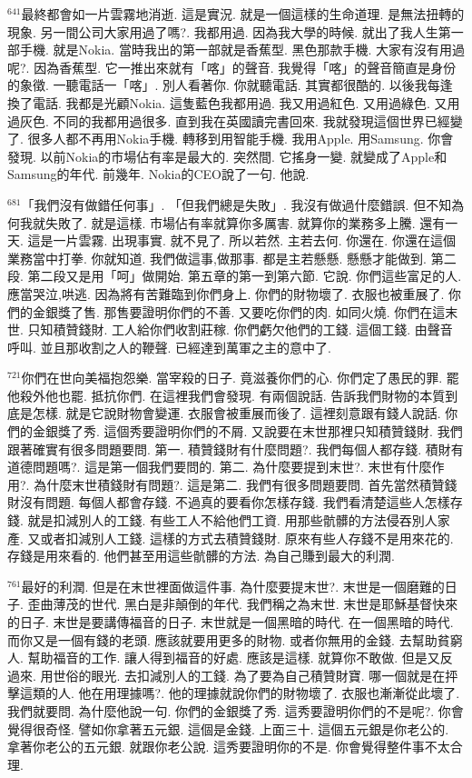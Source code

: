 \documentclass{book}
\begin{document}
$^{641}$最終都會如一片雲霧地消逝.
這是實況.
就是一個這樣的生命道理.
是無法扭轉的現象.
另一間公司大家用過了嗎?.
我都用過.
因為我大學的時候.
就出了我人生第一部手機.
就是Nokia.
當時我出的第一部就是香蕉型.
黑色那款手機.
大家有沒有用過呢?.
因為香蕉型.
它一推出來就有「喀」的聲音.
我覺得「喀」的聲音簡直是身份的象徵.
一聽電話一「喀」.
別人看著你.
你就聽電話.
其實都很酷的.
以後我每逢換了電話.
我都是光顧Nokia.
這隻藍色我都用過.
我又用過紅色.
又用過綠色.
又用過灰色.
不同的我都用過很多.
直到我在英國讀完書回來.
我就發現這個世界已經變了.
很多人都不再用Nokia手機.
轉移到用智能手機.
我用Apple.
用Samsung.
你會發現.
以前Nokia的市場佔有率是最大的.
突然間.
它搖身一變.
就變成了Apple和Samsung的年代.
前幾年.
Nokia的CEO說了一句.
他說.

$^{681}$「我們沒有做錯任何事」.
「但我們總是失敗」.
我沒有做過什麼錯誤.
但不知為何我就失敗了.
就是這樣.
市場佔有率就算你多厲害.
就算你的業務多上騰.
還有一天.
這是一片雲霧.
出現事實.
就不見了.
所以若然.
主若去何.
你還在.
你還在這個業務當中打拳.
你就知道.
我們做這事,做那事.
都是主若懸懸.
懸懸才能做到.
第二段.
第二段又是用「呵」做開始.
第五章的第一到第六節.
它說.
你們這些富足的人.
應當哭泣,哄逃.
因為將有苦難臨到你們身上.
你們的財物壞了.
衣服也被重展了.
你們的金銀獎了售.
那售要證明你們的不善.
又要吃你們的肉.
如同火燒.
你們在這末世.
只知積贊錢財.
工人給你們收割莊稼.
你們虧欠他們的工錢.
這個工錢.
由聲音呼叫.
並且那收割之人的鞭聲.
已經達到萬軍之主的意中了.

$^{721}$你們在世向美福抱怨樂.
當宰殺的日子.
竟滋養你們的心.
你們定了愚民的罪.
罷他殺外他也罷.
抵抗你們.
在這裡我們會發現.
有兩個說話.
告訴我們財物的本質到底是怎樣.
就是它說財物會變運.
衣服會被重展而後了.
這裡刻意跟有錢人說話.
你們的金銀獎了秀.
這個秀要證明你們的不屑.
又說要在末世那裡只知積贊錢財.
我們跟著確實有很多問題要問.
第一.
積贊錢財有什麼問題?.
我們每個人都存錢.
積財有道德問題嗎?.
這是第一個我們要問的.
第二.
為什麼要提到末世?.
末世有什麼作用?.
為什麼末世積錢財有問題?.
這是第二.
我們有很多問題要問.
首先當然積贊錢財沒有問題.
每個人都會存錢.
不過真的要看你怎樣存錢.
我們看清楚這些人怎樣存錢.
就是扣減別人的工錢.
有些工人不給他們工資.
用那些骯髒的方法侵吞別人家產.
又或者扣減別人工錢.
這樣的方式去積贊錢財.
原來有些人存錢不是用來花的.
存錢是用來看的.
他們甚至用這些骯髒的方法.
為自己賺到最大的利潤.

$^{761}$最好的利潤.
但是在末世裡面做這件事.
為什麼要提末世?.
末世是一個磨難的日子.
歪曲薄茂的世代.
黑白是非顛倒的年代.
我們稱之為末世.
末世是耶穌基督快來的日子.
末世是要講傳福音的日子.
末世就是一個黑暗的時代.
在一個黑暗的時代.
而你又是一個有錢的老頭.
應該就要用更多的財物.
或者你無用的金錢.
去幫助貧窮人.
幫助福音的工作.
讓人得到福音的好處.
應該是這樣.
就算你不敢做.
但是又反過來.
用世俗的眼光.
去扣減別人的工錢.
為了要為自己積贊財寶.
哪一個就是在抨擊這類的人.
他在用理據嗎?.
他的理據就說你們的財物壞了.
衣服也漸漸從此壞了.
我們就要問.
為什麼他說一句.
你們的金銀獎了秀.
這秀要證明你們的不是呢?.
你會覺得很奇怪.
譬如你拿著五元銀.
這個是金錢.
上面三十.
這個五元銀是你老公的.
拿著你老公的五元銀.
就跟你老公說.
這秀要證明你的不是.
你會覺得整件事不太合理.
\end{document}
